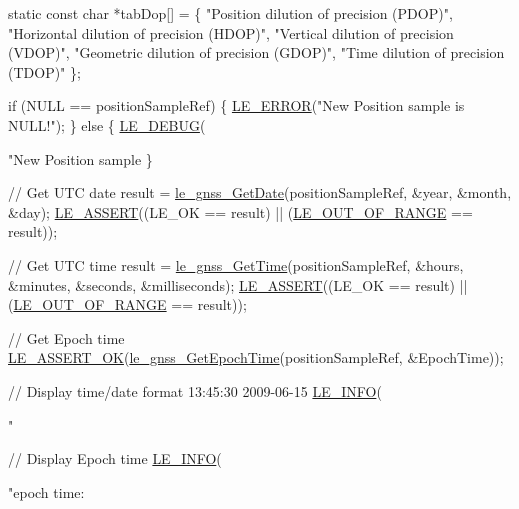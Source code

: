 \begin{DoxyCodeInclude}
{{{{    \textcolor{keyword}{static} \textcolor{keyword}{const} \textcolor{keywordtype}{char} *tabDop[] =
    \{
        \textcolor{stringliteral}{"Position dilution of precision (PDOP)"},
        \textcolor{stringliteral}{"Horizontal dilution of precision (HDOP)"},
        \textcolor{stringliteral}{"Vertical dilution of precision (VDOP)"},
        \textcolor{stringliteral}{"Geometric dilution of precision (GDOP)"},
        \textcolor{stringliteral}{"Time dilution of precision (TDOP)"}
    \};

    \textcolor{keywordflow}{if} (NULL == positionSampleRef)
    \{
        \hyperlink{le__log_8h_a353590f91b3143a7ba3a416ae5a50c3d}{LE\_ERROR}(\textcolor{stringliteral}{"New Position sample is NULL!"});
    \}
    \textcolor{keywordflow}{else}
    \{
        \hyperlink{le__log_8h_a2a91ea8857cf190fde71d85ba930a498}{LE\_DEBUG}(\textcolor{stringliteral}{"New Position sample %
    \}

    \textcolor{comment}{// Get UTC date}
    result = \hyperlink{le__gnss__interface_8h_a29602d1e12325d0076802af0db7f23ca}{le\_gnss\_GetDate}(positionSampleRef, &year, &month, &day);
    \hyperlink{le__log_8h_ac0dbbef91dc0fed449d0092ff0557b39}{LE\_ASSERT}((LE\_OK == result) || (\hyperlink{le__basics_8h_a1cca095ed6ebab24b57a636382a6c86caef8ecf11fa8556fd2d3ca8faab697717}{LE\_OUT\_OF\_RANGE} == result));

    \textcolor{comment}{// Get UTC time}
    result = \hyperlink{le__gnss__interface_8h_a0d014a96fc8b15b736d04747d51082d9}{le\_gnss\_GetTime}(positionSampleRef, &hours, &minutes, &seconds, &milliseconds);
    \hyperlink{le__log_8h_ac0dbbef91dc0fed449d0092ff0557b39}{LE\_ASSERT}((LE\_OK == result) || (\hyperlink{le__basics_8h_a1cca095ed6ebab24b57a636382a6c86caef8ecf11fa8556fd2d3ca8faab697717}{LE\_OUT\_OF\_RANGE} == result));

    \textcolor{comment}{// Get Epoch time}
    \hyperlink{le__log_8h_a7cd2daa3d4af1de4d29e0eed95187484}{LE\_ASSERT\_OK}(\hyperlink{le__gnss__interface_8h_a38c21e7f7f7da5481f67e118fb3ea89c}{le\_gnss\_GetEpochTime}(positionSampleRef, &EpochTime));

    \textcolor{comment}{// Display time/date format 13:45:30 2009-06-15}
    \hyperlink{le__log_8h_a23e6d206faa64f612045d688cdde5808}{LE\_INFO}(\textcolor{stringliteral}{"%

    \textcolor{comment}{// Display Epoch time}
    \hyperlink{le__log_8h_a23e6d206faa64f612045d688cdde5808}{LE\_INFO}(\textcolor{stringliteral}{"epoch time: %

}}}}}}}
\end{DoxyCodeInclude}
